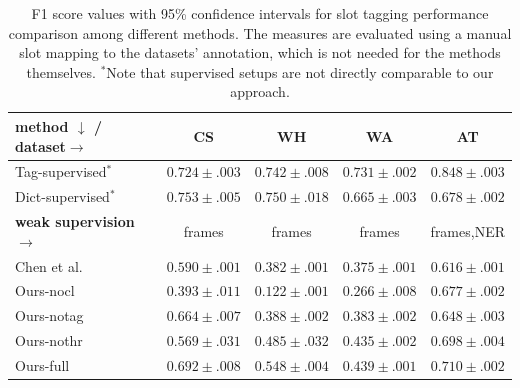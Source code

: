 \begin{table}
        \centering
        \small
        \begin{tabular}{l|c|c|c|c}
        \hline
         \textbf{method} $\downarrow$ / \textbf{dataset}$ \rightarrow$ &  \textbf{CS} & \textbf{WH} & \textbf{WA} & \textbf{AT} \\
         \hline
        Tag-supervised$^\ast$ & $0.724 \pm .003 $ & $\pmb{0.742} \pm .008$ & $\pmb{0.731} \pm .002$ & $\pmb{0.848} \pm .003$ \\
         Dict-supervised$^\ast$ & $\pmb{0.753} \pm .005 $ & $\pmb{0.750} \pm .018$ & $0.665 \pm .003$ & $0.678 \pm .002$ \\\hline
        \bf weak supervision $\rightarrow$ & frames & frames & frames &  frames,NER \\\hline
         Chen et al. & $0.590 \pm .001 $ & $0.382 \pm .001$ & $0.375 \pm .001$ & $0.616 \pm .001$  \\\hdashline[0.5pt/2pt]
         Ours-nocl & $0.393 \pm .011 $ & $0.122 \pm .001$ & $0.266 \pm .008 $ & $ 0.677 \pm .002$ \\
         Ours-notag & $0.664 \pm .007$ & $0.388 \pm .002$ & $0.383 \pm .002$ & $ 0.648 \pm .003$ \\
         Ours-nothr & $0.569 \pm .031$ & $0.485 \pm .032$ & $0.435 \pm .002 $ & $0.698 \pm .004$\\
         Ours-full & $\pmb{0.692} \pm .008$ & $\pmb{0.548} \pm .004$ & $\pmb{0.439} \pm .001$ & $\pmb{0.710} \pm .002$ \\
         \hline
        \end{tabular}
                 
        \caption{F1 score values with 95\% confidence intervals for slot tagging performance comparison among different methods. The measures are evaluated using a manual slot mapping to the datasets' annotation, which is not needed for the methods themselves. $^\ast$Note that supervised setups are not directly comparable to our approach.
        \label{table:slotfilling}
        }
\end{table}

